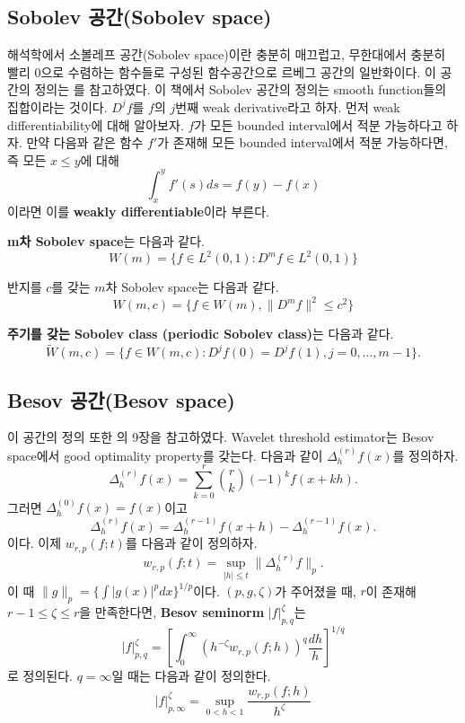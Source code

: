 \documentclass[b5paper,]{scrbook}
\theoremstyle{plain}
\theoremstyle{definition}
\numberwithin{equation}{section}
\let\BeginKnitrBlock\begin \let\EndKnitrBlock\end
\begin{document}
\subsection{Sobolev 공간(Sobolev space)}\label{sobolev-sobolev-space}

해석학에서 소볼레프 공간(Sobolev space)이란 충분히 매끄럽고, 무한대에서
충분히 빨리 0으로 수렴하는 함수들로 구성된 함수공간으로 르베그 공간의
일반화이다. 이 공간의 정의는 \citep{Wasserman2006}를 참고하였다. 이
책에서 Sobolev 공간의 정의는 smooth function들의 집합이라는 것이다.
\(D^{j}f\)를 \(f\)의 \(j\)번째 weak derivative라고 하자. 먼저 weak
differentiability에 대해 알아보자. \(f\)가 모든 bounded interval에서
적분 가능하다고 하자. 만약 다음꽈 같은 함수 \(f'\)가 존재해 모든 bounded
interval에서 적분 가능하다면, 즉 모든 \(x\leq y\)에 대해
\[\int_{x}^{y}f'(s)ds=f(y)-f(x)\] 이라면 이를 \textbf{weakly
differentiable}이라 부른다.

\BeginKnitrBlock{definition}[Sobolev 공간]
\protect\hypertarget{def:unnamed-chunk-24}{}{\label{def:unnamed-chunk-24}
{} }\textbf{m차 Sobolev space}는 다음과 같다.
\[W(m)=\{ f \in L^{2}(0,1): D^{m}f \in L^{2}(0,1)\}\]

반지를 \(c\)를 갖는 \(m\)차 Sobolev space는 다음과 같다.
\[W(m,c)=\{ f \in W(m), \| D^{m}f \|^{2} \leq c^{2}\}\]

\textbf{주기를 갖는 Sobolev class (periodic Sobolev class)}는 다음과
같다.
\[\tilde{W}(m,c)=\{ f \in W(m,c): D^{j}f(0)=D^{j}f(1), j=0,\ldots, m-1 \}.\]
\EndKnitrBlock{definition}

\subsection{Besov 공간(Besov space)}\label{besov-besov-space}

이 공간의 정의 또한 \citep{Wasserman2006}의 9장을 참고하였다. Wavelet
threshold estimator는 Besov space에서 good optimality property를 갖는다.
다음과 같이 \(\Delta_{h}^{(r)}f(x)\)를 정의하자.
\[\Delta_{h}^{(r)}f(x)=\sum_{k=0}^{r}\binom{r}{k}(-1)^{k}f(x+kh).\]
그러면 \(\Delta_{h}^{(0)}f(x)=f(x)\)이고
\[\Delta_{h}^{(r)}f(x)=\Delta_{h}^{(r-1)}f(x+h)-\Delta_{h}^{(r-1)}f(x).\]
이다. 이제 \(w_{r,p}(f;t)\)를 다음과 같이 정의하자.
\[w_{r,p}(f;t)=\sup_{|h|\leq t}\|\Delta_{h}^{(r)}f\|_{p}.\] 이 때
\(\|g\|_{p}=\{ \int |g(x)|^{p}dx \}^{1/p}\)이다. \((p,g,\zeta)\)가
주어졌을 때, \(r\)이 존재해 \(r-1\leq \zeta \leq r\)을 만족한다면,
\textbf{Besov seminorm} \(|f|_{p,q}^{\zeta}\)는
\[|f|_{p,q}^{\zeta}=[\int_{0}^{\infty}(h^{-\zeta}w_{r,p}(f;h))^{q}\frac{dh}{h}]^{1/q}\]
로 정의된다. \(q=\infty\)일 때는 다음과 같이 정의한다.
\[|f|_{p,\infty}^{\zeta}=\sup_{0<h<1}\frac{w_{r,p}(f;h)}{h^{\zeta}}\]
\end{document}
